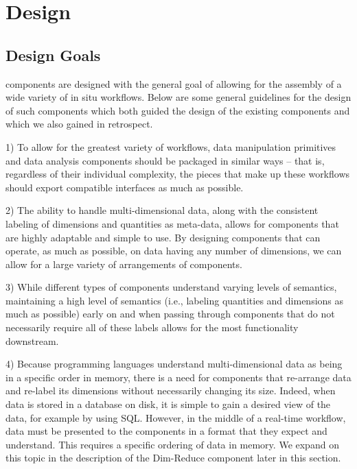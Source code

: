 \section{Design}
\label{s:design}

\subsection{Design Goals}
\label{subsec:design-goals}

\sys components are designed with the
general goal of
allowing for the assembly
of a wide variety of in situ workflows.
Below are some general guidelines
for the design of such components
which both guided the design of the existing \sys
components and which we also gained in retrospect.

1) To allow for the greatest variety of workflows,
data manipulation primitives and data analysis components
should be packaged in similar ways -- that is,
regardless of their individual complexity,
the pieces that make up these workflows
should export compatible interfaces as much as possible.

2) The ability to handle multi-dimensional data,
along with the consistent labeling of
dimensions and quantities as meta-data,
allows for components that are highly
adaptable and simple to use. By designing components
that can operate, as much as possible, on data
having any number of dimensions, we can
allow for a large variety of arrangements
of components.

3) While different types of components understand
varying levels of semantics, maintaining a
high level of semantics (i.e., labeling
quantities and dimensions as much
as possible) early on and when passing
through components that do not necessarily
require all of these labels allows for the most
functionality downstream.

4) Because programming languages understand
multi-dimensional data as being in a
specific order in memory, there is a need for
components that re-arrange data and
re-label its dimensions without necessarily
changing its size. Indeed, when data is stored
in a database on disk, it is simple to gain a desired
view of the data, for example by using SQL.
However, in the middle of a real-time workflow,
data must be presented to the components in a
format that they expect and understand.
This requires a specific ordering of data in
memory.
We expand on this topic in the description
of the Dim-Reduce component later in this section.

